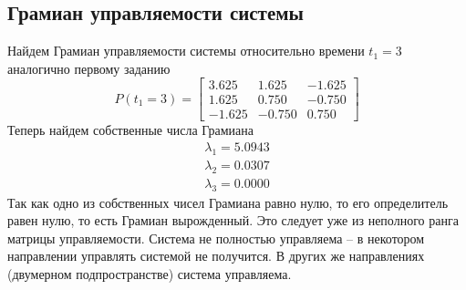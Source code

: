 \documentclass[a4paper, 12pt]{article}
\begin{document}
    \subsection{Грамиан управляемости системы}
    Найдем Грамиан управляемости системы относительно времени $t_1=3$ аналогично первому заданию
    $$
    P\left(t_1=3\right)=\begin{bmatrix}
    3.625    &1.625   &-1.625\\
    1.625    &0.750   &-0.750\\
   -1.625   &-0.750    &0.750
    \end{bmatrix}
    $$
    Теперь найдем собственные числа Грамиана
    \begin{align*}
        \lambda_1=5.0943\\
        \lambda_2=0.0307\\
        \lambda_3=0.0000
    \end{align*}
    Так как одно из собственных чисел Грамиана равно нулю, то его определитель равен нулю, то есть Грамиан вырожденный.
    Это следует уже из неполного ранга матрицы управляемости. Система не полностью управляема -- в некотором направлении
    управлять системой не получится. В других же направлениях (двумерном подпространстве) система управляема.
\end{document}

